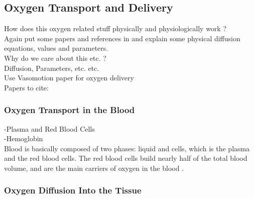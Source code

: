 \subsection{Oxygen Transport and Delivery}

How does this oxygen related stuff physically and physiologically work ?
\\Again put some papers and references in and explain some physical diffusion equations, values and parameters.
\\Why do we care about this etc. ?
\\Diffusion, Parameters, etc. etc.
\\Use Vasomotion paper for oxygen delivery \cite{goldman2001computational}
\\Papers to cite: \cite{bukwirwa}

\subsubsection*{Oxygen Transport in the Blood}

-Plasma and Red Blood Cells
\\-Hemoglobin
\\Blood is basically composed of two phases: liquid and cells, which is the plasma and the red blood cells. The red blood cells build nearly half of the total blood volume, and are the main carriers of oxygen in the blood \cite{pittman2011regulation}.

\subsubsection*{Oxygen Diffusion Into the Tissue}

